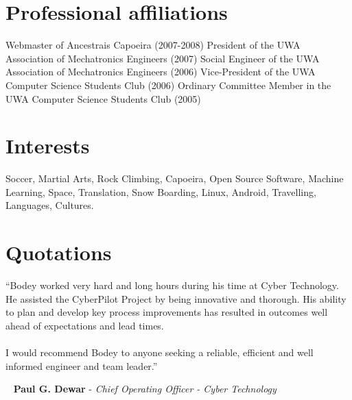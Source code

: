 \documentclass[10pt, a4paper]{report}
\begin{document}
%


\section*{Professional affiliations}
Webmaster of Ancestrais Capoeira (2007-2008) \newline
President of the UWA Association of Mechatronics Engineers (2007) \newline
Social Engineer of the UWA Association of Mechatronics Engineers (2006) \newline
Vice-President of the UWA Computer Science Students Club (2006) \newline
Ordinary Committee Member in the UWA Computer Science Students Club (2005) \newline

\section*{Interests}
{\large Soccer, Martial Arts, Rock Climbing, Capoeira, Open Source Software, Machine Learning, Space, Translation, Snow Boarding, Linux, Android, Travelling, Languages, Cultures.}

\pagebreak

\section*{Quotations}
{\large ``Bodey worked very hard and long hours during his time at Cyber Technology. He assisted the CyberPilot Project by being innovative and thorough. His ability to plan and develop key process improvements has resulted in outcomes well ahead of expectations and lead times.
\\
\\
I would recommend Bodey to anyone seeking a reliable, efficient and well informed engineer and team leader.''}

~\hspace*{4em} {\bf Paul G. Dewar} - {\em Chief Operating Officer - Cyber Technology}
\end{document}
